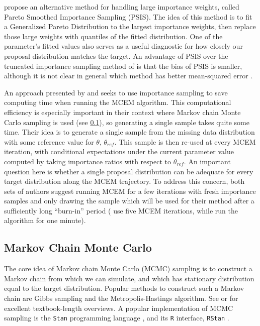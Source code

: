\documentclass[11pt, oneside]{article}   	%
\begin{document}
\citet{Veh22} propose an alternative method for handling large importance weights, called Pareto Smoothed Importance Sampling (PSIS). The idea of this method is to fit a Generalized Pareto Distribution to the largest importance weights, then replace those large weights with quantiles of the fitted distribution. One of the parameter's fitted values also serves as a useful diagnostic for how closely our proposal distribution matches the target. An advantage of PSIS over the truncated importance sampling method of \citet{Ion08} is that the bias of PSIS is smaller, although it is not clear in general which method has better mean-squared error \citep[see][for extensive numerical comparisons]{Veh22}.  


An approach presented by \citet{Qui99} and \citet{Lev01} seeks to use importance sampling to save computing time when running the MCEM algorithm. This computational efficiency is especially important in their context where Markov chain Monte Carlo sampling is used (see \ref{sec:MCMC}), so generating a single sample takes quite some time. Their idea is to generate a single sample from the missing data distribution with some reference value for $\theta$, $\theta_{ref}$. This sample is then re-used at every MCEM iteration, with conditional expectations under the current parameter value computed by taking importance ratios with respect to $\theta_{ref}$. An important question here is whether a single proposal distribution can be adequate for every target distribution along the MCEM trajectory. To address this concern, both sets of authors suggest running MCEM for a few iterations with fresh importance samples and only drawing the sample which will be used for their method after a sufficiently long ``burn-in'' period (\citeauthor{Qui99} use five MCEM iterations, while \citeauthor{Lev01} run the algorithm for one minute).


\subsection{Markov Chain Monte Carlo}
\label{sec:MCMC}

The core idea of Markov chain Monte Carlo (MCMC) sampling is to construct a Markov chain from which we can simulate, and which has stationary distribution equal to the target distribution. Popular methods to construct such a Markov chain are Gibbs sampling and the Metropolis-Hastings algorithm. See \citet{Gel13} or \citet{Rob04} for excellent textbook-length overviews. A popular implementation of MCMC sampling is the \texttt{Stan} programming language \citep{Sta22}, and its \texttt{R} interface, \texttt{RStan} \citep{Sta23}.
\end{document}
